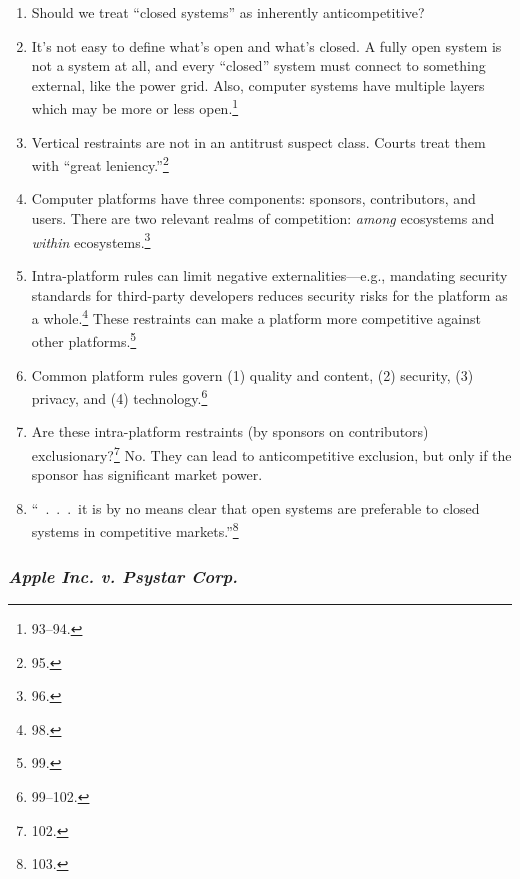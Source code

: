 \begin{enumerate}
    \item Should we treat ``closed systems'' as inherently anticompetitive?
    \item It's not easy to define what's open and what's closed. A fully open 
    system is not a system at all, and every ``closed'' system must connect to 
    something external, like the power grid. Also, computer systems have 
    multiple layers which may be more or less open.\footnote{93--94.}
    \item Vertical restraints are not in an antitrust suspect class. Courts 
    treat them with ``great leniency.''\footnote{95.}
    \item Computer platforms have three components: sponsors, contributors, 
    and users. There are two relevant realms of competition: \emph{among} 
    ecosystems and \emph{within} ecosystems.\footnote{96.}
    \item Intra-platform rules can limit negative externalities---e.g., 
    mandating security standards for third-party developers reduces security 
    risks for the platform as a whole.\footnote{98.} These restraints can make 
    a platform more competitive against other platforms.\footnote{99.}
    \item Common platform rules govern (1) quality and content, (2) security, 
    (3) privacy, and (4) technology.\footnote{99--102.}
    \item Are these intra-platform restraints (by sponsors on contributors) 
    exclusionary?\footnote{102.} No. They can lead to anticompetitive 
    exclusion, but only if the sponsor has significant market power.
    \item ``~.~.~.~it is by no means clear that open systems are preferable to 
    closed systems in competitive markets.''\footnote{103.}
\end{enumerate}

\subsubsection{\emph{Apple Inc. v. Psystar Corp.}}

